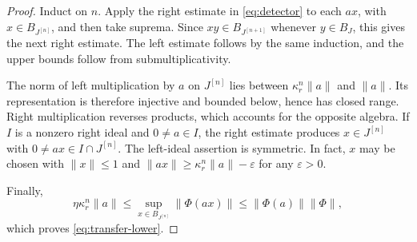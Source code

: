 \documentclass[10pt,a4paper]{amsart}
\begin{document}
\begin{proof}
Induct on $n$. Apply the right estimate in \eqref{eq:detector} to each $ax$, with $x\in B_{J^{[n]}}$, and then take suprema. Since $xy\in B_{J^{[n+1]}}$ whenever $y\in B_J$, this gives the next right estimate. The left estimate follows by the same induction, and the upper bounds follow from submultiplicativity.

The norm of left multiplication by $a$ on $J^{[n]}$ lies between $\kappa_r^n\|a\|$ and $\|a\|$. Its representation is therefore injective and bounded below, hence has closed range. Right multiplication reverses products, which accounts for the opposite algebra. If $I$ is a nonzero right ideal and $0\ne a\in I$, the right estimate produces $x\in J^{[n]}$ with $0\ne ax\in I\cap J^{[n]}$. The left-ideal assertion is symmetric. In fact, $x$ may be chosen with $\|x\|\leq1$ and $\|ax\|\geq\kappa_r^n\|a\|-\varepsilon$ for any $\varepsilon>0$.

Finally,
\[
 \eta\kappa_r^n\|a\|
 \leq\sup_{x\in B_{J^{[n]}}}\|\Phi(ax)\|
 \leq\|\Phi(a)\|\|\Phi\|,
\]
which proves \eqref{eq:transfer-lower}.
\end{proof}
\end{document}
